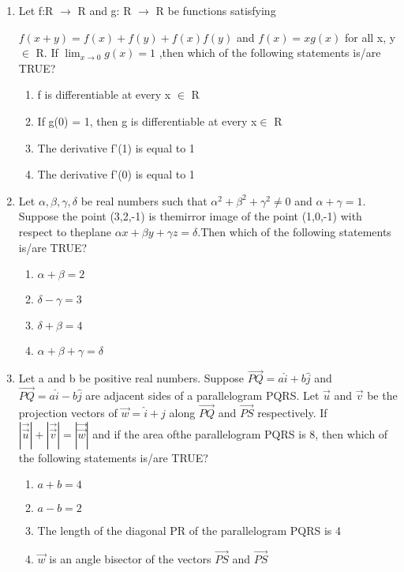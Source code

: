 \documentclass{article}
\begin{document}
\begin{enumerate}
\item Let f:R $\to$ R and g: R $\to$ R be functions satisfying

$f(x + y) = f(x) + f(y) + f(x)f(y)$ and $f(x) = xg(x)$
for all x, y $\in$ R. If $\lim_{x \to 0}g(x) = 1$
,then which of the following statements is/are TRUE?\\

\begin{enumerate}[label=\Alph*]
\item f is differentiable at every x $\in$ R
\item If g(0) = 1, then g is differentiable at every x$\in$ R
\item The derivative f'(1) is equal to 1
\item The derivative f'(0) is equal to 1
\end{enumerate}

\item Let $\alpha,\beta,\gamma,\delta$ be real numbers such that $\alpha^2 + \beta^2 + \gamma^2 \neq 0$ and $\alpha + \gamma = 1$. Suppose the point (3,2,-1) is themirror image of the point (1,0,-1) with respect to theplane ${\alpha}x + {\beta}y + {\gamma}z = \delta$.Then which of the following statements is/are TRUE?\\

\begin{enumerate}[label=\Alph*]
\item $\alpha + \beta = 2$ 
\item $\delta - \gamma = 3$
\item $\delta + \beta = 4 $ 
\item $\alpha + \beta + \gamma = \delta$
\end{enumerate}

\item Let a and b be positive real numbers. Suppose $\overrightarrow {PQ} = a\hat{i} + b\hat{j}$ and $\overrightarrow{PQ} = a\hat{i} - b\hat{j}$ are adjacent sides 
of a parallelogram PQRS. Let $\overrightarrow{u}$ and $\overrightarrow{v}$ be the projection vectors of $\overrightarrow{w} = \hat{i} + \hat{j}$ along $\overrightarrow{PQ}$ and $\overrightarrow{PS}$ respectively. If $|\vec{\overrightarrow{u}}| + |\vec{\overrightarrow{v}}| = |\vec{\overrightarrow{w}}|$ and if the area ofthe parallelogram PQRS is 8, then which of the following statements is/are TRUE?

\begin{enumerate}[label=\Alph*]
\item $a + b = 4$
\item $a - b = 2$
\item The length of the diagonal PR of the parallelogram PQRS is 4
\item $\overrightarrow{w}$ is an angle bisector of the vectors $\overrightarrow{PS}$ and $\overrightarrow{PS}$
\end{enumerate}


\end{enumerate}
\end{document}
